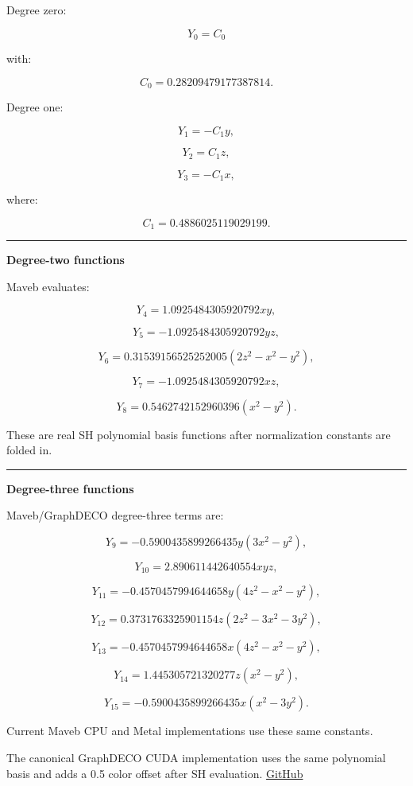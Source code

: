 Degree zero:

\[
Y_0=
C_0
\]

with:

\[
C_0=
0.28209479177387814.
\]

Degree one:

\[
Y_1=-C_1y,
\]

\[
Y_2=C_1z,
\]

\[
Y_3=-C_1x,
\]

where:

\[
C_1=
0.4886025119029199.
\]

\begin{center}\rule{0.5\linewidth}{0.5pt}\end{center}

\textbf{Degree-two functions}

Maveb evaluates:

\[
Y_4=
1.0925484305920792xy,
\]

\[
Y_5=
-1.0925484305920792yz,
\]

\[
Y_6=
0.31539156525252005
(2z^2-x^2-y^2),
\]

\[
Y_7=
-1.0925484305920792xz,
\]

\[
Y_8=
0.5462742152960396
(x^2-y^2).
\]

These are real SH polynomial basis functions after normalization constants are folded in.

\begin{center}\rule{0.5\linewidth}{0.5pt}\end{center}

\textbf{Degree-three functions}

Maveb/GraphDECO degree-three terms are:

\[
Y_9=
-0.5900435899266435
y(3x^2-y^2),
\]

\[
Y_{10}
=
2.890611442640554xyz,
\]

\[
Y_{11}
=
-0.4570457994644658
y(4z^2-x^2-y^2),
\]

\[
Y_{12}
=
0.3731763325901154
z(2z^2-3x^2-3y^2),
\]

\[
Y_{13}
=
-0.4570457994644658
x(4z^2-x^2-y^2),
\]

\[
Y_{14}
=
1.445305721320277
z(x^2-y^2),
\]

\[
Y_{15}
=
-0.5900435899266435
x(x^2-3y^2).
\]

Current Maveb CPU and Metal implementations use these same constants.

The canonical GraphDECO CUDA implementation uses the same polynomial basis and adds a 0.5 color offset after SH evaluation. \href{https://github.com/graphdeco-inria/diff-gaussian-rasterization/blob/main/cuda_rasterizer/forward.cu?utm_source=chatgpt.com}{GitHub}

